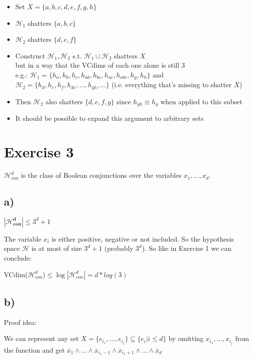\documentclass{article}
\begin{document}
		\begin{itemize}
			\item Set $X=\{a,b,c,d,e,f,g,h\}$
			\item $\mathcal{H}_1$ shatters $\{a,b,c\}$
			\item $\mathcal{H}_2$ shatters $\{d,e,f\}$
			\item Construct $\mathcal{H}_1,\mathcal{H}_2$ s.t. $\mathcal{H}_1\cup \mathcal{H}_2$ shatters $X$
			\\ but in a way that the VCdims of each one alone is still 3 
			\\ e.g.: $\mathcal{H}_1=\{h_a,h_b,h_c,h_{ab},h_{bc},h_{ac},h_{abc},h_g,h_h\}$
			and $\mathcal{H}_2=\{h_d,h_e,h_f,h_{de},...,h_{gh},...\}$ (i.e. everything that's missing to shatter $X$) 
			\item Then $\mathcal{H}_2$ also shatters $\{d,e,f,g\}$ since $h_{gh} \equiv h_g$ when applied to this subset
			\item It should be possible to expand this argument to arbitrary sets
		\end{itemize}	


\section*{Exercise 3}
$\mathcal{H}^d_{con}$ is the class of Boolean conjunctions over the variables
$x_1,\ldots,x_d$.
\subsection*{a)}
$\mathbf{|\mathcal{H}_{con}^d|}\leq 3^d + 1$



The variable $x_i$ is either positive, negative or not included. So the
hypothesis space $\mathcal{H}$ is at most of size $3^d + 1$ (probably $3^d$). So
like in Exercise 1 we can conclude:

VCdim($\mathcal{H}_{con}^d$)$\leq \log|\mathcal{H}_{con}^d| = d*log(3)$

\subsection*{b)}
Proof idea:

We can represent any set $X=\{e_{i_1},...,e_{i_j}\}\subseteq \{e_i|i\leq d\}$ by omitting $x_{i_1},...,x_{i_j}$ from the function and get $\overline{x}_1\land \ldots \land \overline{x}_{i_1-1} \land \overline{x}_{i_1+1} \land \ldots \land \overline{x}_d$
\end{document}
